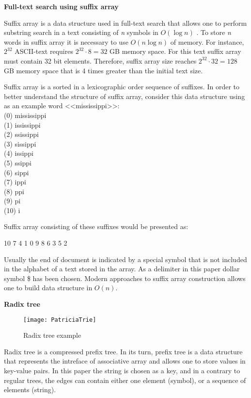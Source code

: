 \textbf{Full-text search using suffix array}

Suffix array is a data structure used in full-text search that allows one to perform
substring search in a text consisting of \emph{n} symbols in $O(\log{}n)$ \cite{manber1993suffix}.
To store \emph{n} words in suffix array it is necessary to use $O(n \log{}n)$ of memory.
For instance, $2^{32}$ ASCII-text requires $2^{32} \cdot 8 = 32$ GB memory space.
For this text suffix array must contain 32 bit elements.
Therefore, suffix array size reaches $2^{32} \cdot 32 = 128$ GB memory space that is
4 times greater than the initial text size.

Suffix array is a sorted in a lexicographic order sequence of suffixes.
In order to better understand the structure of suffix array, consider this data structure
using as an example word <<mississippi>>:
\\(0) mississippi
\\(1) ississippi
\\(2) ssissippi
\\(3) sissippi
\\(4) issippi
\\(5) ssippi
\\(6) sippi
\\(7) ippi
\\(8) ppi
\\(9) pi
\\(10) i

Suffix array consisting of these suffixes would be presented as:

10 7 4 1 0 9 8 6 3 5 2

Usually the end of document is indicated by a special symbol that is not included in
the alphabet of a text stored in the array.
As a delimiter in this paper dollar symbol \$ has been chosen.
Modern approaches to suffix array construction allows one to  build data structure in $O(n)$.

\textbf{Radix tree}


\begin{wrapfigure}{r}{0.25\textwidth} %
 \centering
 \texttt{[image: PatriciaTrie]}
 \caption{Radix tree example}
\end{wrapfigure}

Radix tree is a compressed prefix tree. In its turn, prefix tree is a data structure
that represents the intreface of associative array and allows one to store values in key-value pairs.
In this paper the string is chosen as a key, and in a contrary to regular trees,
the edges can contain either one element (symbol), or a sequence of elements (string).

